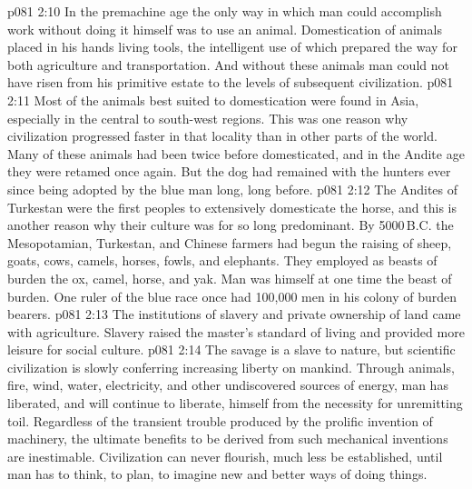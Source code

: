 \vs p081 2:10 \pc In the premachine age the only way in which man could accomplish work without doing it himself was to use an animal. Domestication of animals placed in his hands living tools, the intelligent use of which prepared the way for both agriculture and transportation. And without these animals man could not have risen from his primitive estate to the levels of subsequent civilization.
\vs p081 2:11 Most of the animals best suited to domestication were found in Asia, especially in the central to south\hyp{}west regions. This was one reason why civilization progressed faster in that locality than in other parts of the world. Many of these animals had been twice before domesticated, and in the Andite age they were retamed once again. But the dog had remained with the hunters ever since being adopted by the blue man long, long before.
\vs p081 2:12 The Andites of Turkestan were the first peoples to extensively domesticate the horse, and this is another reason why their culture was for so long predominant. By 5000\,B.C. the Mesopotamian, Turkestan, and Chinese farmers had begun the raising of sheep, goats, cows, camels, horses, fowls, and elephants. They employed as beasts of burden the ox, camel, horse, and yak. Man was himself at one time the beast of burden. One ruler of the blue race once had 100,000 men in his colony of burden bearers.
\vs p081 2:13 \pc The institutions of slavery and private ownership of land came with agriculture. Slavery raised the master’s standard of living and provided more leisure for social culture.
\vs p081 2:14 The savage is a slave to nature, but scientific civilization is slowly conferring increasing liberty on mankind. Through animals, fire, wind, water, electricity, and other undiscovered sources of energy, man has liberated, and will continue to liberate, himself from the necessity for unremitting toil. Regardless of the transient trouble produced by the prolific invention of machinery, the ultimate benefits to be derived from such mechanical inventions are inestimable. Civilization can never flourish, much less be established, until man has  to think, to plan, to imagine new and better ways of doing things.
